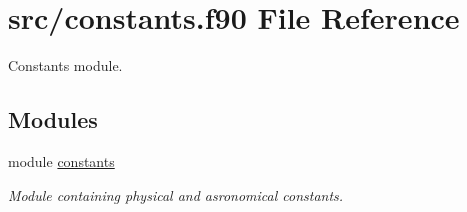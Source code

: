 \hypertarget{constants_8f90}{}\section{src/constants.f90 File Reference}
\label{constants_8f90}


Constants module.  


\subsection*{Modules}
\begin{DoxyCompactItemize}
\item 
module \hyperlink{namespaceconstants}{constants}
\begin{DoxyCompactList}\small\item\em Module containing physical and asronomical constants. \end{DoxyCompactList}\end{DoxyCompactItemize}
